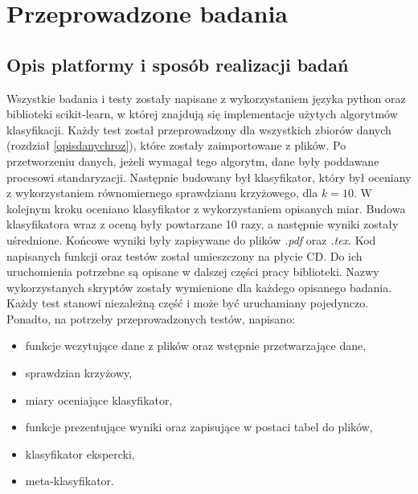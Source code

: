 \chapter{Przeprowadzone badania}

\section{Opis platformy i sposób realizacji badań}
Wszystkie badania i testy zostały napisane z wykorzystaniem języka python oraz biblioteki scikit-learn, w której znajdują się implementacje użytych algorytmów klasyfikacji. Każdy test został przeprowadzony dla wszystkich zbiorów danych (rozdział \ref{opisdanychroz}), które zostały zaimportowane z plików. Po przetworzeniu danych, jeżeli wymagał tego algorytm, dane były poddawane procesowi standaryzacji. Następnie budowany był klasyfikator, który był oceniany z wykorzystaniem równomiernego sprawdzianu krzyżowego, dla $k=10$. W kolejnym kroku oceniano klasyfikator z wykorzystaniem opisanych miar. Budowa klasyfikatora wraz z oceną były powtarzane 10 razy, a następnie wyniki zostały uśrednione. Końcowe wyniki były zapisywane do plików \textit{.pdf} oraz \textit{.tex}. Kod napisanych funkcji oraz testów został umieszczony na płycie CD. Do ich uruchomienia potrzebne są opisane w dalszej części pracy biblioteki. Nazwy wykorzystanych skryptów zostały wymienione dla każdego opisanego badania. Każdy test stanowi niezależną część i może być uruchamiany pojedynczo. Ponadto, na potrzeby przeprowadzonych testów, napisano:
\begin{itemize}
	\item funkcje wczytujące dane z plików oraz wstępnie przetwarzające dane,
	\item sprawdzian krzyżowy,
	\item miary oceniające klasyfikator,
	\item funkcje prezentujące wyniki oraz zapisujące w postaci tabel do plików,
	\item klasyfikator ekspercki,
	\item meta-klasyfikator.
\end{itemize}

